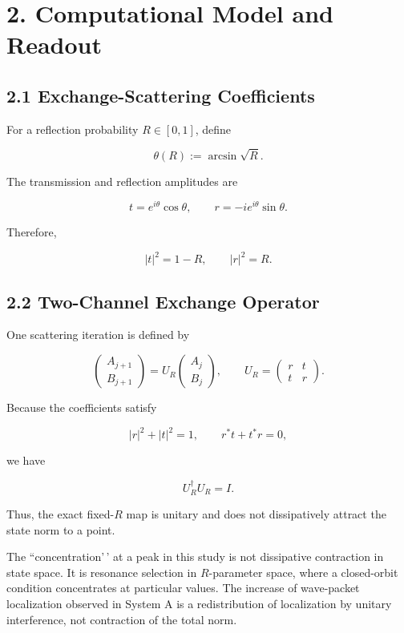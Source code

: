 \documentclass[
  10pt,
  a4paper,
]{article}
\begin{document}
\section{2. Computational Model and
Readout}\label{computational-model-and-readout}

\subsection{2.1 Exchange-Scattering
Coefficients}\label{exchange-scattering-coefficients}

For a reflection probability \(R\in[0,1]\), define

\[
\theta(R):=\arcsin\sqrt R.
\]

The transmission and reflection amplitudes are

\[
t=e^{i\theta}\cos\theta,
\qquad
r=-ie^{i\theta}\sin\theta.
\]

Therefore,

\[
|t|^2=1-R,
\qquad
|r|^2=R.
\]

\subsection{2.2 Two-Channel Exchange
Operator}\label{two-channel-exchange-operator}

One scattering iteration is defined by

\[
\boxed{
\begin{pmatrix}
A_{j+1}\\
B_{j+1}
\end{pmatrix}
=
U_R
\begin{pmatrix}
A_j\\
B_j
\end{pmatrix},
\qquad
U_R=
\begin{pmatrix}
r&t\\
t&r
\end{pmatrix}
}.
\]

Because the coefficients satisfy

\[
|r|^2+|t|^2=1,
\qquad
r^*t+t^*r=0,
\]

we have

\[
U_R^\dagger U_R=I.
\]

Thus, the exact fixed-\(R\) map is unitary and does not dissipatively
attract the state norm to a point.

The ``concentration'\,' at a peak in this study is not dissipative
contraction in state space. It is resonance selection in \(R\)-parameter
space, where a closed-orbit condition concentrates at particular values.
The increase of wave-packet localization observed in System A is a
redistribution of localization by unitary interference, not contraction
of the total norm.
\end{document}
